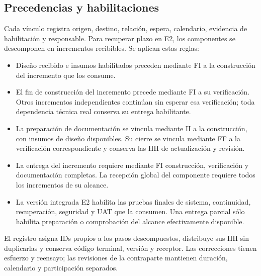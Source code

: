 \subsection{Precedencias y habilitaciones}
Cada vínculo registra origen, destino, relación, espera, calendario, evidencia de habilitación y responsable. Para recuperar plazo en E2, los componentes se descomponen en incrementos recibibles. Se aplican estas reglas:
\begin{itemize}
\item Diseño recibido e insumos habilitados preceden mediante FI a la construcción del incremento que los consume.
\item El fin de construcción del incremento precede mediante FI a su verificación. Otros incrementos independientes continúan sin esperar esa verificación; toda dependencia técnica real conserva su entrega habilitante.
\item La preparación de documentación se vincula mediante II a la construcción, con insumos de diseño disponibles. Su cierre se vincula mediante FF a la verificación correspondiente y conserva las HH de actualización y revisión.
\item La entrega del incremento requiere mediante FI construcción, verificación y documentación completas. La recepción global del componente requiere todos los incrementos de su alcance.
\item La versión integrada E2 habilita las pruebas finales de sistema, continuidad, recuperación, seguridad y UAT que la consumen. Una entrega parcial sólo habilita preparación o comprobación del alcance efectivamente disponible.
\end{itemize}
El registro asigna IDs propios a los pasos descompuestos, distribuye sus HH sin duplicarlas y conserva código terminal, versión y receptor. Las correcciones tienen esfuerzo y reensayo; las revisiones de la contraparte mantienen duración, calendario y participación separados.

